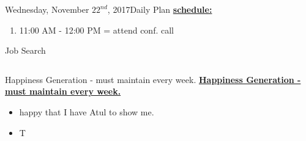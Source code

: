 \begin{columns}
\begin{column}{0.333\columnwidth}
\begin{frame}{Wednesday, November $22^{nd}$, 2017}{Daily Plan}
\underline{\bf schedule:}\\
\begin{enumerate}
\tiny \item \tiny 11:00 AM - 12:00 PM = attend conf. call
\end{enumerate}
\end{frame}
\begin{frame}{Job Search}

\tiny{} 




\end{frame}
\ifdefined\POSTER
  \begin{columns}
   \begin{column}{0.22\columnwidth}
      \begin{block}{Happiness Generation - must maintain every week.}
\else
 \underline{\bf Happiness Generation - must maintain every week.} 
\fi
        \begin{itemize}
          \tiny \item \tiny happy that I have Atul to show me.  
          \item \tiny T 
        \end{itemize}
\ifdefined\POSTER
      \end{block}
\fi


\end{column}
\end{columns}
\end{column}
\end{columns}
